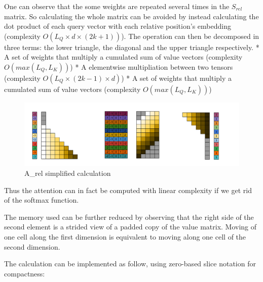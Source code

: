 One can observe that the some weights are repeated several times in the
\(S_{rel}\) matrix. So calculating the whole matrix can be avoided by
instead calculating the dot product of each query vector with each
relative position's embedding (complexity
\(O \left(L_Q\times d\times(2k+1)\right)\)). The operation can then be
decomposed in three terms: the lower triangle, the diagonal and the
upper triangle respectively. * A set of weights that multiply a
cumulated sum of value vectors (complexity \(O(max(L_Q, L_K))\)) * A
elementwise multipliation between two tensors (complexity
\(O(L_Q\times (2k-1) \times d)\)) * A set of weights that multiply a
cumulated sum of value vectors (complexity \(O(max(L_Q, L_K))\))

\begin{figure}
\centering
\includegraphics{images/S_rel_V_detailed.png}
\caption{A\_rel simplified calculation}
\end{figure}

Thus the attention can in fact be computed with linear complexity if we
get rid of the softmax function.

The memory used can be further reduced by observing that the right side
of the second element is a strided view of a padded copy of the value
matrix. Moving of one cell along the first dimension is equivalent to
moving along one cell of the second dimension.

The calculation can be implemented as follow, using zero-based slice
notation for compactness:

